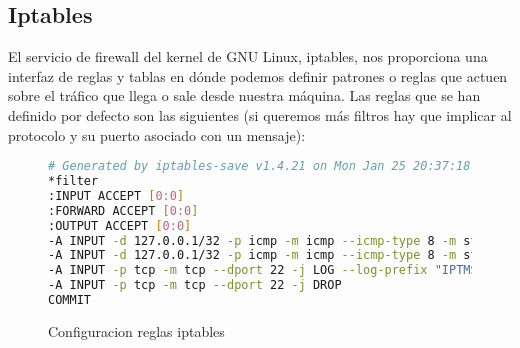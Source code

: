 \subsection{Iptables}

El servicio de firewall del kernel de GNU Linux, iptables, nos proporciona una interfaz de reglas y tablas en dónde podemos definir patrones o reglas que actuen sobre el tráfico que llega o sale desde nuestra máquina. Las reglas que se han definido por defecto son las siguientes (si queremos más filtros hay que implicar al protocolo y su puerto asociado con un mensaje):

\begin{figure}[H]
\begin{lstlisting}[language=bash]
# Generated by iptables-save v1.4.21 on Mon Jan 25 20:37:18 2016
*filter
:INPUT ACCEPT [0:0]
:FORWARD ACCEPT [0:0]
:OUTPUT ACCEPT [0:0]
-A INPUT -d 127.0.0.1/32 -p icmp -m icmp --icmp-type 8 -m state --state NEW,RELATED,ESTABLISHED -j LOG --log-prefix "IPTMSG=Connection ICMP "
-A INPUT -d 127.0.0.1/32 -p icmp -m icmp --icmp-type 8 -m state --state NEW,RELATED,ESTABLISHED -j DROP
-A INPUT -p tcp -m tcp --dport 22 -j LOG --log-prefix "IPTMSG=Connection SSH "
-A INPUT -p tcp -m tcp --dport 22 -j DROP
COMMIT
\end{lstlisting}
\caption{Configuracion reglas iptables}
\end{figure}

